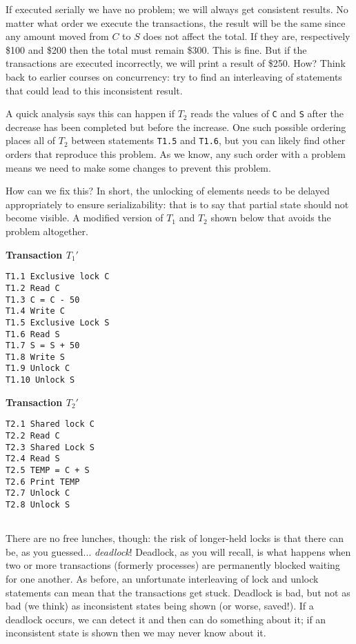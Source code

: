 \documentclass[a4paper]{report}
\begin{document}
If executed serially we have no problem; we will always get consistent results. No matter what order we execute the transactions, the result will be the same since any amount moved from $C$ to $S$ does not affect the total. If they are, respectively \$100 and \$200 then the total must remain \$300. This is fine. But if the transactions are executed incorrectly, we will print a result of \$250. How?  Think back to earlier courses on concurrency: try to find an interleaving of statements that could lead to this inconsistent result.

A quick analysis says this can happen if $T_{2}$ reads the values of \texttt{C} and \texttt{S} after the decrease has been completed but before the increase. One such possible ordering places all of $T_{2}$ between statements \texttt{T1.5} and \texttt{T1.6}, but you can likely find other orders that reproduce this problem. As we know, any such order with a problem means we need to make some changes to prevent this problem.

How can we fix this? In short, the unlocking of elements needs to be delayed appropriately to ensure serializability: that is to say that partial state should not become visible. A modified version of $T_{1}$ and $T_{2}$ shown below that avoids the problem altogether.

\begin{multicols}{2}
\textbf{Transaction $T_{1}'$}
\begin{verbatim}
T1.1 Exclusive lock C
T1.2 Read C
T1.3 C = C - 50
T1.4 Write C
T1.5 Exclusive Lock S
T1.6 Read S
T1.7 S = S + 50
T1.8 Write S
T1.9 Unlock C
T1.10 Unlock S
\end{verbatim}

\columnbreak
\textbf{Transaction $T_{2}'$}
\begin{verbatim}
T2.1 Shared lock C
T2.2 Read C
T2.3 Shared Lock S
T2.4 Read S
T2.5 TEMP = C + S
T2.6 Print TEMP
T2.7 Unlock C
T2.8 Unlock S


\end{verbatim}
\end{multicols}

There are no free lunches, though: the risk of longer-held locks is that there can be, as you guessed... \textit{deadlock}! Deadlock, as you will recall, is what happens when two or more transactions (formerly processes) are permanently blocked waiting for one another. As before, an unfortunate interleaving of lock and unlock statements can mean that the transactions get stuck. Deadlock is bad, but not as bad (we think) as inconsistent states being shown (or worse, saved!). If a deadlock occurs, we can detect it and then can do something about it; if an inconsistent state is shown then we may never know about it.
\end{document}
